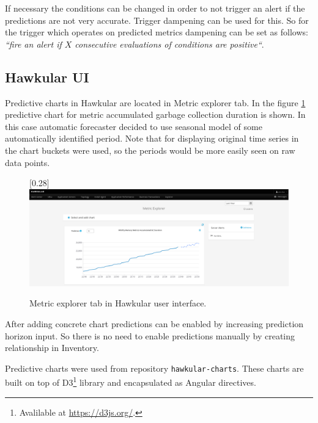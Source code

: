         If necessary the conditions can be changed in
        order to not trigger an alert if the predictions are not very accurate. Trigger dampening can be used for this.
        So for the trigger which operates on predicted metrics dampening can be set as follows: \emph{``fire an alert if
        $X$ consecutive evaluations of conditions are positive``}.

        \subsection{Hawkular UI}
        Predictive charts in Hawkular are located in Metric explorer tab. In the figure \ref{img:hawkular-explorer}
        predictive chart for metric accumulated garbage collection duration is shown. In this case automatic
        forecaster decided to use seasonal model of some automatically identified period. Note that for displaying
        original time series in the chart buckets were used, so the periods would be more easily seen on raw data
        points.

        \begin{figure}[H]
            \begin{center}
                \scalebox{0.185}[0.28]{\includegraphics[angle=0]{img/hawkular-explorer.pdf}}
                \caption{Metric explorer tab in Hawkular user interface.}
                \label{img:hawkular-explorer}
            \end{center}
        \end{figure}

        After adding concrete chart predictions can be enabled by increasing prediction horizon input.
        So there is no need to enable predictions manually by creating relationship in Inventory.

        Predictive charts were used from repository \texttt{hawkular-charts}. These charts are built on top of
        D3\footnote{Avalilable at \url{https://d3js.org/}.} library and encapsulated as Angular directives.

